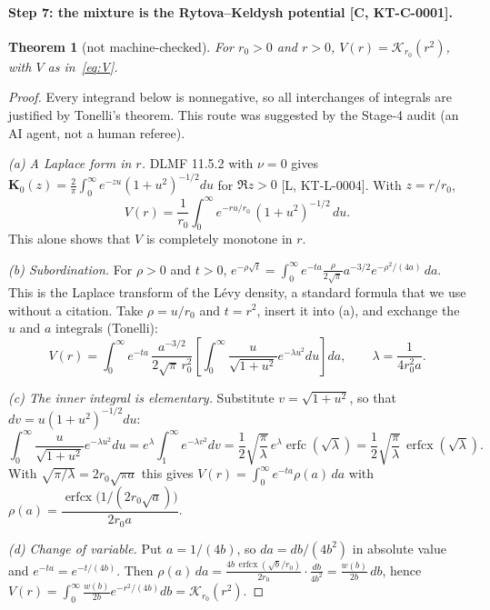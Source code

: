 \documentclass[11pt]{article}
\newtheorem{theorem}{Theorem}
\theoremstyle{remark}
\newcommand{\tier}[1]{\textsf{[#1]}}
\newcommand{\erfcx}{\operatorname{erfcx}}
\begin{document}
\paragraph{Step 7: the mixture is the Rytova--Keldysh potential \tier{C, KT-C-0001}.}
\begin{theorem}[not machine-checked]\label{thm:ident}
For $r_0>0$ and $r>0$, $V(r)=\mathcal K_{r_0}(r^2)$, with $V$ as in~\eqref{eq:V}.
\end{theorem}
\begin{proof}
Every integrand below is nonnegative, so all interchanges of integrals are justified by Tonelli's theorem. This route
was suggested by the Stage-4 audit (an AI agent, not a human referee).

\emph{(a) A Laplace form in $r$.} DLMF 11.5.2 with $\nu=0$ gives
$\mathbf K_0(z)=\frac2\pi\int_0^\infty e^{-zu}(1+u^2)^{-1/2}du$ for $\Re z>0$ \tier{L, KT-L-0004}. With $z=r/r_0$,
\[V(r)=\frac1{r_0}\int_0^\infty e^{-ru/r_0}\,(1+u^2)^{-1/2}\,du .\]
This alone shows that $V$ is completely monotone in $r$.

\emph{(b) Subordination.} For $\rho>0$ and $t>0$,
$e^{-\rho\sqrt t}=\int_0^\infty e^{-ta}\frac{\rho}{2\sqrt\pi}a^{-3/2}e^{-\rho^2/(4a)}\,da$. This is the Laplace
transform of the L\'evy density, a standard formula that we use without a citation. Take $\rho=u/r_0$ and $t=r^2$,
insert it into (a), and exchange the $u$ and $a$ integrals (Tonelli):
\[V(r)=\int_0^\infty e^{-ta}\,\frac{a^{-3/2}}{2\sqrt\pi\,r_0^2}\left[\int_0^\infty\frac{u}{\sqrt{1+u^2}}
e^{-\lambda u^2}du\right]da,\qquad \lambda=\frac1{4r_0^2a}.\]

\emph{(c) The inner integral is elementary.} Substitute $v=\sqrt{1+u^2}$, so that $dv=u(1+u^2)^{-1/2}du$:
\[\int_0^\infty\frac{u}{\sqrt{1+u^2}}e^{-\lambda u^2}du=e^{\lambda}\int_1^\infty e^{-\lambda v^2}dv
=\frac12\sqrt{\frac\pi\lambda}\,e^{\lambda}\operatorname{erfc}(\sqrt\lambda)=\frac12\sqrt{\frac\pi\lambda}\,
\erfcx(\sqrt\lambda).\]
With $\sqrt{\pi/\lambda}=2r_0\sqrt{\pi a}$ this gives
$V(r)=\int_0^\infty e^{-ta}\rho(a)\,da$ with $\rho(a)=\dfrac{\erfcx\!\big(1/(2r_0\sqrt a)\big)}{2r_0a}$.

\emph{(d) Change of variable.} Put $a=1/(4b)$, so $da=db/(4b^2)$ in absolute value and $e^{-ta}=e^{-t/(4b)}$. Then
$\rho(a)\,da=\frac{4b\,\erfcx(\sqrt b/r_0)}{2r_0}\cdot\frac{db}{4b^2}=\frac{w(b)}{2b}\,db$, hence
$V(r)=\int_0^\infty\frac{w(b)}{2b}e^{-r^2/(4b)}db=\mathcal K_{r_0}(r^2)$.


\end{proof}
\end{document}
